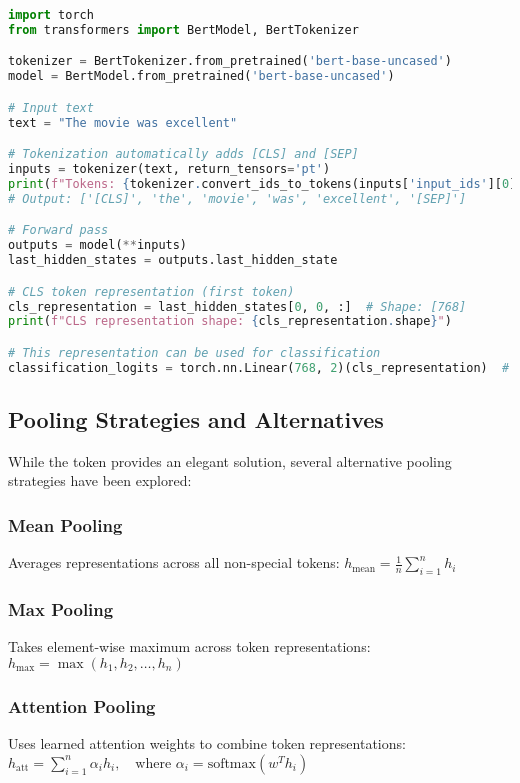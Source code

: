 \begin{lstlisting}[language=Python, caption=CLS Token Processing]
import torch
from transformers import BertModel, BertTokenizer

tokenizer = BertTokenizer.from_pretrained('bert-base-uncased')
model = BertModel.from_pretrained('bert-base-uncased')

# Input text
text = "The movie was excellent"

# Tokenization automatically adds [CLS] and [SEP]
inputs = tokenizer(text, return_tensors='pt')
print(f"Tokens: {tokenizer.convert_ids_to_tokens(inputs['input_ids'][0])}")
# Output: ['[CLS]', 'the', 'movie', 'was', 'excellent', '[SEP]']

# Forward pass
outputs = model(**inputs)
last_hidden_states = outputs.last_hidden_state

# CLS token representation (first token)
cls_representation = last_hidden_states[0, 0, :]  # Shape: [768]
print(f"CLS representation shape: {cls_representation.shape}")

# This representation can be used for classification
classification_logits = torch.nn.Linear(768, 2)(cls_representation)  # Binary classification
\end{lstlisting}

\subsection{Pooling Strategies and Alternatives}

While the \cls{} token provides an elegant solution, several alternative pooling strategies have been explored:

\subsubsection{Mean Pooling}
Averages representations across all non-special tokens:
$h_{\text{mean}} = \frac{1}{n} \sum_{i=1}^{n} h_i$

\subsubsection{Max Pooling}
Takes element-wise maximum across token representations:
$h_{\text{max}} = \max(h_1, h_2, \ldots, h_n)$

\subsubsection{Attention Pooling}
Uses learned attention weights to combine token representations:
$h_{\text{att}} = \sum_{i=1}^{n} \alpha_i h_i, \quad \text{where } \alpha_i = \text{softmax}(w^T h_i)$

